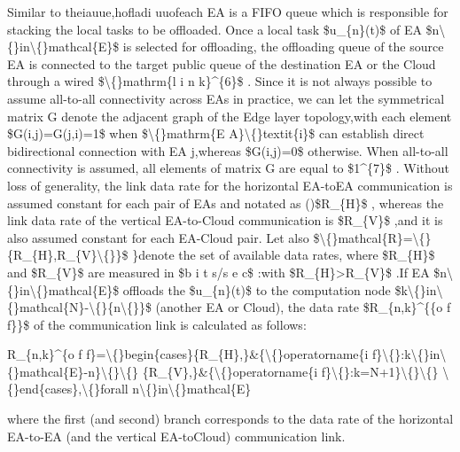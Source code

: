 \documentclass{article}
\begin{document}
Similar to theiauue,hofladi uuofeach EA is a FIFO queue which is responsible for stacking the local tasks to be offloaded. Once a local task \$u\_\{n\}(t)\$ of EA \$n\textbackslash\{\}in\textbackslash\{\}mathcal\{E\}\$ is selected for offloading, the offloading queue of the source EA is connected to the target public queue of the destination EA or the Cloud through a wired \$\textbackslash\{\}mathrm\{l i n k\}\textasciicircum{}\{6\}\$ . Since it is not always possible to assume all-to-all connectivity across EAs in practice, we can let the symmetrical matrix G denote the adjacent graph of the Edge layer topology,with each element \$G(i,j)=G(j,i)=1\$ when \$\textbackslash\{\}mathrm\{E A\}\textbackslash\{\}textit\{i\}\$ can establish direct bidirectional connection with EA j,whereas \$G(i,j)=0\$ otherwise. When all-to-all connectivity is assumed, all elements of matrix G are equal to \$1\textasciicircum{}\{7\}\$ . Without loss of generality, the link data rate for the horizontal EA-toEA communication is assumed constant for each pair of EAs and notated as ()\$R\_\{H\}\$ , whereas the link data rate of the vertical EA-to-Cloud communication is \$R\_\{V\}\$ ,and it is also assumed constant for each EA-Cloud pair. Let also \$\textbackslash\{\}mathcal\{R\}=\textbackslash\{\}\{R\_\{H\},R\_\{V\}\textbackslash\{\}\}\$ \}denote the set of available data rates, where \$R\_\{H\}\$ and \$R\_\{V\}\$ are measured in \$b i t s/s e c\$ :with \$R\_\{H\}>R\_\{V\}\$ .If EA \$n\textbackslash\{\}in\textbackslash\{\}mathcal\{E\}\$ offloads the \$u\_\{n\}(t)\$ to the computation node \$k\textbackslash\{\}in\textbackslash\{\}mathcal\{N\}-\textbackslash\{\}\{n\textbackslash\{\}\}\$ (another EA or Cloud), the data rate \$R\_\{n,k\}\textasciicircum{}\{\{o f f\}\}\$ of the communication link is calculated as follows:

R\_\{n,k\}\textasciicircum{}\{o f f\}=\textbackslash\{\}begin\{cases\}\{R\_\{H\},\}\&\{\textbackslash\{\}operatorname\{i f\}\textbackslash\{\}:k\textbackslash\{\}in\textbackslash\{\}mathcal\{E\}-n\}\textbackslash\{\}\textbackslash\{\} \{R\_\{V\},\}\&\{\textbackslash\{\}operatorname\{i f\}\textbackslash\{\}:k=N+1\}\textbackslash\{\}\textbackslash\{\} \textbackslash\{\}end\{cases\},\textbackslash\{\}forall n\textbackslash\{\}in\textbackslash\{\}mathcal\{E\}

where the first (and second) branch corresponds to the data rate of the horizontal EA-to-EA (and the vertical EA-toCloud) communication link.
\end{document}
